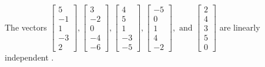 \begin{exercise}
\begin{exerciseStatement}
  \end{exerciseStatement}
  \begin{exerciseAnswer}
   The vectors \(\left[\begin{array}{r}
5 \\
-1 \\
1 \\
-3 \\
2
\end{array}\right] , \left[\begin{array}{r}
3 \\
-2 \\
0 \\
-4 \\
-6
\end{array}\right] , \left[\begin{array}{r}
4 \\
5 \\
1 \\
-3 \\
-5
\end{array}\right] , \left[\begin{array}{r}
-5 \\
0 \\
1 \\
4 \\
-2
\end{array}\right] , \text{ and } \left[\begin{array}{r}
2 \\
4 \\
3 \\
5 \\
0
\end{array}\right]\) are 
  	 linearly independent  .
  


  \end{exerciseAnswer}
\end{exercise}